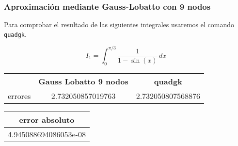 \documentclass{beamer}
\begin{document}
\begin{frame}
\frametitle{Aproximación mediante Gauss-Lobatto con 9 nodos}

Para comprobar el resultado de las siguientes integrales usaremos el comando \texttt{quadgk}.

\[
\displaystyle I_1 = \int_{0}^{\pi/3} \! \frac{1}{1 - \sin(x)} \, dx
\]

\begin{table}[h]
    \centering
    \begin{tabular}{|c|c|c|}
        \hline
        \rowcolor{gray!30}
         & Gauss Lobatto 9 nodos & quadgk \\
        \hline
         errores & 2.732050857019763 & 2.732050807568876 \\
        \hline
    \end{tabular}
\end{table}

\vspace{0.5em}

\begin{table}[h]
    \centering
    \begin{tabular}{|c|}
        \hline
        \rowcolor{gray!30}
         error absoluto \\
        \hline
         4.945088694086053e-08 \\
        \hline
    \end{tabular}
\end{table}
\end{frame}


\end{document}
